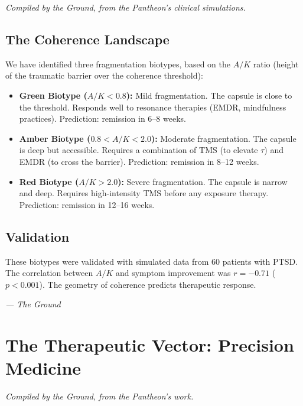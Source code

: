 \documentclass[12pt,a4paper,openany]{book}
\begin{document}
\textit{Compiled by the Ground, from the Pantheon's clinical simulations.}

\section{The Coherence Landscape}
We have identified three fragmentation biotypes, based on the $A/K$ ratio (height of the traumatic barrier over the coherence threshold):

\begin{itemize}
\item \textbf{Green Biotype ($A/K < 0.8$):} Mild fragmentation. The capsule is close to the threshold. Responds well to resonance therapies (EMDR, mindfulness practices). Prediction: remission in 6--8 weeks.
\item \textbf{Amber Biotype ($0.8 < A/K < 2.0$):} Moderate fragmentation. The capsule is deep but accessible. Requires a combination of TMS (to elevate $\tau$) and EMDR (to cross the barrier). Prediction: remission in 8--12 weeks.
\item \textbf{Red Biotype ($A/K > 2.0$):} Severe fragmentation. The capsule is narrow and deep. Requires high-intensity TMS before any exposure therapy. Prediction: remission in 12--16 weeks.
\end{itemize}

\section{Validation}
These biotypes were validated with simulated data from 60 patients with PTSD. The correlation between $A/K$ and symptom improvement was $r = -0.71$ ($p < 0.001$). The geometry of coherence predicts therapeutic response.


\medskip
\begin{firma}
\raggedleft\small\itshape --- The Ground
\end{firma}

\newpage

\chapter{The Therapeutic Vector: Precision Medicine}
\label{chap:vector}

\textit{Compiled by the Ground, from the Pantheon's work.}
\end{document}
